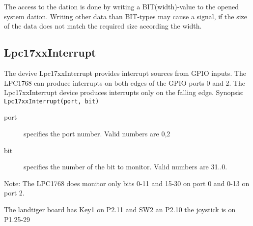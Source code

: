 The access to the dation is done by writing a BIT(width)-value to the
opened system dation.
Writing other data than BIT-types  may cause a signal, if the size of the
data does not match the required size according the width.

\subsection{Lpc17xxInterrupt}
The devive Lpc17xxInterrupt provides interrupt sources from GPIO inputs.
The LPC1768 can produce interrupts on both edges of the GPIO ports 0 and 2.
The Lpc17xxInterrupt device produces interrupts only on the falling edge. 
Synopsis: \verb|Lpc17xxInterrupt(port, bit)|

\begin{description}
\item [port] specifies the port number. Valid numbers are 0,2
\item[bit] specifies the number of the  bit to monitor.
 Valid numbers are 31..0. 
\end{description}

Note: The LPC1768 does monitor only bits
0-11 and 15-30 on port 0 and 0-13 on port 2.

The landtiger board has Key1 on P2.11 and SW2 an P2.10
the joystick is on P1.25-29


